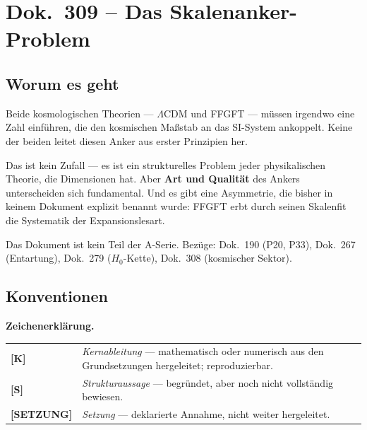 \maketitle
\tableofcontents

\chapter*{Dok.~309 -- Das Skalenanker-Problem}

\section*{Worum es geht}

Beide kosmologischen Theorien — $\Lambda$CDM und FFGFT — müssen irgendwo
eine Zahl einführen, die den kosmischen Maßstab an das SI-System ankoppelt.
Keine der beiden leitet diesen Anker aus erster Prinzipien her.

Das ist kein Zufall — es ist ein strukturelles Problem jeder physikalischen
Theorie, die Dimensionen hat. Aber \textbf{Art und Qualität} des Ankers
unterscheiden sich fundamental. Und es gibt eine Asymmetrie, die bisher
in keinem Dokument explizit benannt wurde: FFGFT erbt durch seinen
Skalenfit die Systematik der Expansionslesart.

Das Dokument ist kein Teil der A-Serie.
Bezüge: Dok.~190 (P20, P33), Dok.~267 (Entartung), Dok.~279 ($H_0$-Kette),
Dok.~308 (kosmischer Sektor).

\section*{Konventionen}

\noindent\textbf{Zeichenerklärung.}

\medskip
\begin{tabular}{@{}lp{11cm}}
\textbf{[K]}       & \emph{Kernableitung} — mathematisch oder numerisch
                     aus den Grundsetzungen hergeleitet; reproduzierbar. \\[4pt]
\textbf{[S]}       & \emph{Strukturaussage} — begründet, aber noch nicht
                     vollständig bewiesen. \\[4pt]
\textbf{[SETZUNG]} & \emph{Setzung} — deklarierte Annahme, nicht weiter
                     hergeleitet. \\
\end{tabular}

